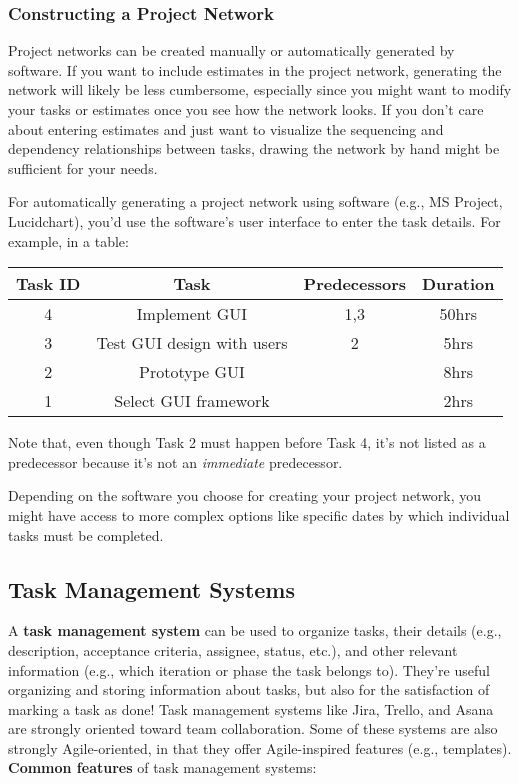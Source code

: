 \subsubsection{Constructing a Project Network}

Project networks can be created manually or automatically generated by software. If you want to include estimates in the project network, generating the network will likely be less cumbersome, especially since you might want to modify your tasks or estimates once you see how the network looks. If you don't care about entering estimates and just want to visualize the sequencing and dependency relationships between tasks, drawing the network by hand might be sufficient for your needs.

For automatically generating a project network using software (e.g., MS Project, Lucidchart), you'd use the software's user interface to enter the task details. For example, in a table:

\begin{center}
\begin{tabular}{c|c|c|c}
\rowcolor{light-gray}
Task ID & Task & Predecessors\index{predecessor}\index{task predecessor} & Duration \\
\hline
4 & Implement GUI & 1,3 & 50hrs \\
\hline
3 & Test GUI design with users & 2 & 5hrs \\
\hline
2 & Prototype GUI & & 8hrs \\
\hline
1 & Select GUI framework & & 2hrs \\
\end{tabular}
\end{center}

Note that, even though Task 2 must happen before Task 4, it's not listed as a predecessor because it's not an \textit{immediate} predecessor.

Depending on the software you choose for creating your project network, you might have access to more complex options like specific dates by which individual tasks must be completed.

\subsection{Task Management Systems}

A \textbf{task management system}\marginpar{\taskManagementSystemDef} can be used to organize tasks, their details (e.g., description, acceptance criteria, assignee, status, etc.), and other relevant information (e.g., which iteration or phase the task belongs to). They're useful organizing and storing information about tasks, but also for the satisfaction of marking a task as done! Task management systems like Jira, Trello, and Asana are strongly oriented toward team collaboration. Some of these systems are also strongly Agile-oriented, in that they offer Agile-inspired features (e.g., templates). \textbf{Common features} of task management systems:

